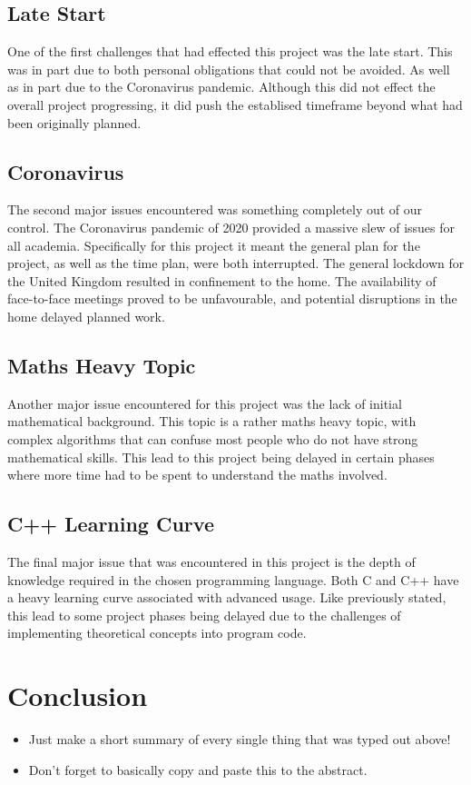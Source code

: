 \documentclass{article}
\begin{document}
\subsection{Late Start}
One of the first challenges that had effected this project was the late start. This was in part due to both personal obligations that could not be avoided. As well as in part due to the Coronavirus pandemic. Although this did not effect the overall project progressing, it did push the establised timeframe beyond what had been originally planned.

\subsection{Coronavirus}
The second major issues encountered was something completely out of our control. The Coronavirus
pandemic of 2020 provided a massive slew of issues for all academia. Specifically for this project
it meant the general plan for the project, as well as the time plan, were both interrupted. The
general lockdown for the United Kingdom resulted in confinement to the home. The availability of
face-to-face meetings proved to be unfavourable, and potential disruptions in the home delayed
planned work.

\subsection{Maths Heavy Topic}
Another major issue encountered for this project was the lack of initial mathematical background. This topic is a rather maths heavy topic, with complex algorithms that can confuse most people who do not have strong mathematical skills. This lead to this project being delayed in certain phases where more time had to be spent to understand the maths involved.

\subsection{C++ Learning Curve}
The final major issue that was encountered in this project is the depth of knowledge required in the chosen programming language. Both C and C++ have a heavy learning curve associated with advanced usage. Like previously stated, this lead to some project phases being delayed due to the challenges of implementing theoretical concepts into program code.

\section{Conclusion}
\begin{itemize}
    \item Just make a short summary of every single thing that was typed out above!
    \item Don't forget to basically copy and paste this to the abstract.
\end{itemize}

\newpage


\end{document}
